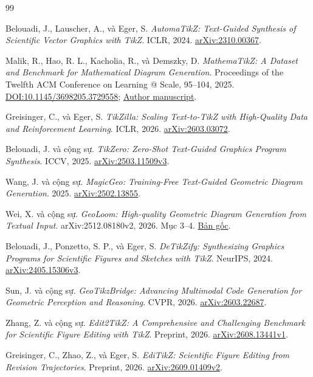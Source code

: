\documentclass[a4paper,12pt]{article}
\begin{document}
\begin{thebibliography}{99}

 Belouadi, J., Lauscher, A., và Eger, S. \emph{AutomaTikZ: Text-Guided Synthesis of Scientific Vector Graphics with TikZ}. ICLR, 2024. \href{https://arxiv.org/abs/2310.00367}{arXiv:2310.00367}.

 Malik, R., Hao, R. L., Kacholia, R., và Demszky, D. \emph{MathemaTikZ: A Dataset and Benchmark for Mathematical Diagram Generation}. Proceedings of the Twelfth ACM Conference on Learning @ Scale, 95--104, 2025. \href{https://doi.org/10.1145/3698205.3729558}{DOI:10.1145/3698205.3729558}; \href{https://www.dorademszky.com/publications/49731.pdf}{Author manuscript}.

 Greisinger, C., và Eger, S. \emph{TikZilla: Scaling Text-to-TikZ with High-Quality Data and Reinforcement Learning}. ICLR, 2026. \href{https://arxiv.org/abs/2603.03072}{arXiv:2603.03072}.

 Belouadi, J. và cộng sự. \emph{TikZero: Zero-Shot Text-Guided Graphics Program Synthesis}. ICCV, 2025. \href{https://arxiv.org/abs/2503.11509v3}{arXiv:2503.11509v3}.

 Wang, J. và cộng sự. \emph{MagicGeo: Training-Free Text-Guided Geometric Diagram Generation}. 2025. \href{https://arxiv.org/abs/2502.13855}{arXiv:2502.13855}.

 Wei, X. và cộng sự. \emph{GeoLoom: High-quality Geometric Diagram Generation from Textual Input}. arXiv:2512.08180v2, 2026. Mục 3–4. \href{https://arxiv.org/html/2512.08180v2#S4.SS2}{Bản gốc}.

 Belouadi, J., Ponzetto, S. P., và Eger, S. \emph{DeTikZify: Synthesizing Graphics Programs for Scientific Figures and Sketches with TikZ}. NeurIPS, 2024. \href{https://arxiv.org/abs/2405.15306v3}{arXiv:2405.15306v3}.

 Sun, J. và cộng sự. \emph{GeoTikzBridge: Advancing Multimodal Code Generation for Geometric Perception and Reasoning}. CVPR, 2026. \href{https://arxiv.org/abs/2603.22687}{arXiv:2603.22687}.

 Zhang, Z. và cộng sự. \emph{Edit2TikZ: A Comprehensive and Challenging Benchmark for Scientific Figure Editing with TikZ}. Preprint, 2026. \href{https://arxiv.org/abs/2608.13441v1}{arXiv:2608.13441v1}.

 Greisinger, C., Zhao, Z., và Eger, S. \emph{EdiTikZ: Scientific Figure Editing from Revision Trajectories}. Preprint, 2026. \href{https://arxiv.org/abs/2609.01409v2}{arXiv:2609.01409v2}.


\end{thebibliography}
\end{document}
